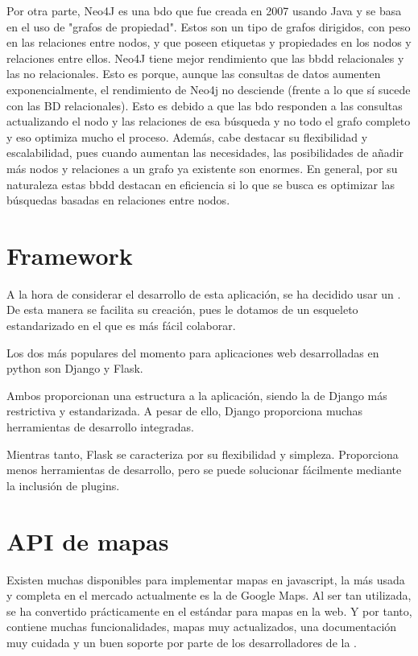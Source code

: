     Por otra parte, Neo4J es una \ac{bdo} que fue creada en 2007 usando Java y se basa en el uso de "grafos de propiedad". Estos son un tipo de grafos dirigidos, con peso en las relaciones entre nodos, y que poseen etiquetas y propiedades en los nodos y relaciones entre ellos. Neo4J tiene mejor rendimiento que las \ac{bbdd} relacionales y las no relacionales. Esto es porque, aunque las consultas de datos aumenten exponencialmente, el rendimiento de Neo4j no desciende (frente a lo que sí sucede con las BD relacionales). Esto es debido a que las \ac{bdo} responden a las consultas actualizando el nodo y las relaciones de esa búsqueda y no todo el grafo completo y eso optimiza mucho el proceso.
    Además, cabe destacar su flexibilidad y escalabilidad, pues cuando aumentan las necesidades, las posibilidades de añadir más nodos y relaciones a un grafo ya existente son enormes.
    En general, por su naturaleza estas \ac{bbdd} destacan en eficiencia si lo que se busca es optimizar las búsquedas basadas en relaciones entre nodos. 
    
    
  \section{Framework}
    A la hora de considerar el desarrollo de esta aplicación, se ha decidido usar un . De esta manera se facilita su creación, pues le dotamos de un esqueleto estandarizado en el que es más fácil colaborar.
    
    Los dos  más populares del momento para aplicaciones web desarrolladas en python son Django\cite{django} y Flask\cite{flask}.
    
    Ambos proporcionan una estructura a la aplicación, siendo la de Django más restrictiva y estandarizada. A pesar de ello, Django proporciona muchas herramientas de desarrollo integradas.
    
    Mientras tanto, Flask se caracteriza por su flexibilidad y simpleza. Proporciona menos herramientas de desarrollo, pero se puede solucionar fácilmente mediante la inclusión de plugins.
    
  
  \section{API de mapas}
  
    Existen muchas  disponibles para implementar mapas en javascript, la más usada y completa en el mercado actualmente es la de Google Maps\cite{gmaps}. Al ser tan utilizada, se ha convertido prácticamente en el estándar para mapas en la web. Y por tanto, contiene muchas funcionalidades, mapas muy actualizados, una documentación muy cuidada y un buen soporte por parte de los desarrolladores de la .
    

